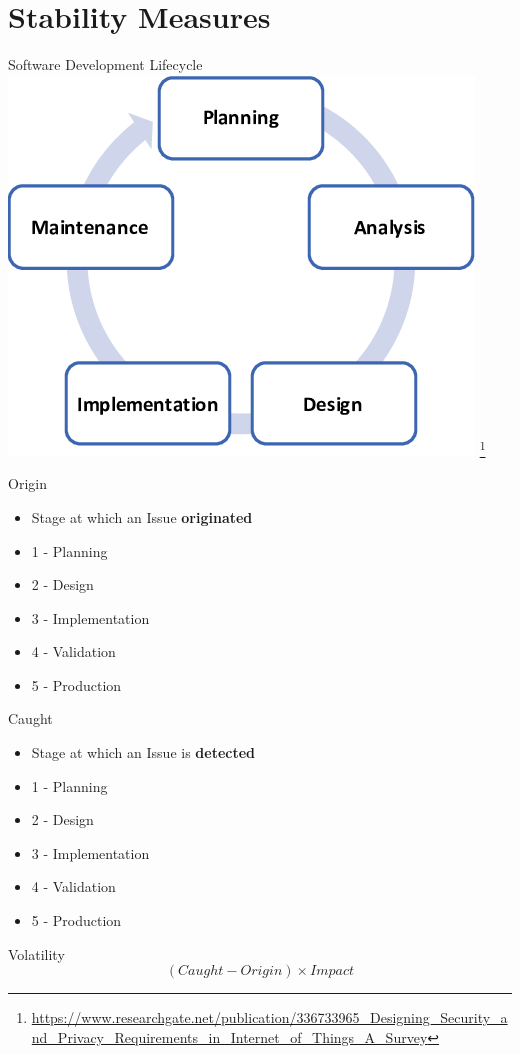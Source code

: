 \documentclass[aspectratio=169]{beamer}
\begin{document}
\section{Stability Measures}
\begin{frame}{Software Development Lifecycle}
    \centering
    \includegraphics[width=\textwidth,height=0.7\textheight,keepaspectratio]{sdlc.png} \footnote{\url{https://www.researchgate.net/publication/336733965_Designing_Security_and_Privacy_Requirements_in_Internet_of_Things_A_Survey}}
\end{frame}
\begin{frame}{Origin}
    \begin{itemize}
        \item Stage at which an Issue \textbf{originated} 
        \item 1 - Planning
        \item 2 - Design
        \item 3 - Implementation
        \item 4 - Validation
        \item 5 - Production
    \end{itemize}
\end{frame}
\begin{frame}{Caught}
    \begin{itemize}
        \item Stage at which an Issue is \textbf{detected}
        \item 1 - Planning
        \item 2 - Design
        \item 3 - Implementation
        \item 4 - Validation
        \item 5 - Production
    \end{itemize}
\end{frame}
\begin{frame}{Volatility}
    $$(Caught - Origin) \times Impact$$
\end{frame}
\end{document}
